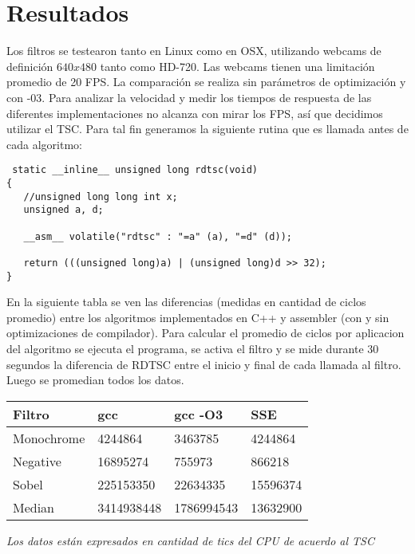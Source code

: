 \section{Resultados}
 Los filtros se testearon tanto en Linux como en OSX, utilizando webcams de definici\'on $640 x 480$ tanto como HD-720. Las webcams tienen una limitaci\'on promedio de 20 FPS. La comparaci\'on se realiza sin par\'ametros de optimizaci\'on y con -03. Para analizar la velocidad y medir los tiempos de respuesta de las diferentes implementaciones no alcanza con mirar los FPS, as\'i que decidimos utilizar el TSC. Para tal fin generamos la siguiente rutina que es llamada antes de cada algoritmo:
 \begin{verbatim}
 static __inline__ unsigned long rdtsc(void)
{
   //unsigned long long int x;
   unsigned a, d;

   __asm__ volatile("rdtsc" : "=a" (a), "=d" (d));

   return (((unsigned long)a) | (unsigned long)d >> 32);
}
 \end{verbatim}
 En la siguiente tabla se ven las diferencias (medidas en cantidad de ciclos promedio) entre los algoritmos implementados en C++ y assembler (con y sin optimizaciones de compilador).
 Para calcular el promedio de ciclos por aplicacion del algoritmo se ejecuta el programa, se activa el filtro y se mide durante 30 segundos la diferencia de RDTSC entre el inicio y final de cada llamada al filtro. Luego se promedian todos los datos.

\begin{center}
    \begin{tabular}{ | l | l | l | p{5cm} |}
    \hline
    Filtro & gcc & gcc -O3 & SSE \\ \hline
    Monochrome & 4244864  & 3463785 & 4244864  \\ \hline
    Negative & 16895274 & 755973 & 866218  \\ \hline
    Sobel & 225153350 & 22634335 & 15596374  \\ \hline
    Median & 3414938448 & 1786994543 & 13632900  \\ \hline
    \end{tabular}
$ $ \\ \textit{Los datos est\'an expresados en cantidad de tics del CPU de acuerdo al TSC}
\end{center}